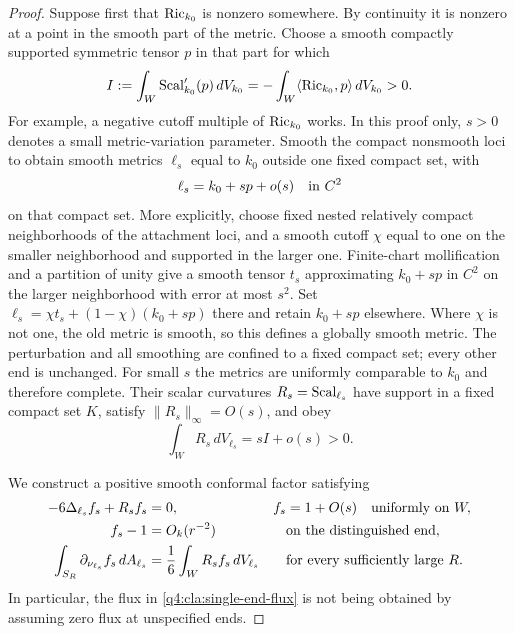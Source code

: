 \begin{proof}
Suppose first that $\operatorname{Ric}_{k_0}$ is nonzero somewhere.
By continuity it is nonzero at a point in the smooth part of the
metric.  Choose a smooth compactly supported symmetric tensor $p$
in that part for which
\begin{equation}\label{q4:cla:positive-scalar-variation}
 I:=\int_W \operatorname{Scal}'_{k_0}(p)\,dV_{k_0}
   =-\int_W\langle\operatorname{Ric}_{k_0},p\rangle\,dV_{k_0}>0.
\end{equation}
For example, a negative cutoff multiple of $\operatorname{Ric}_{k_0}$ works.
In this proof only, $s>0$ denotes a small metric-variation parameter.
Smooth the compact nonsmooth loci to obtain smooth metrics $\ell_s$
equal to $k_0$ outside one fixed compact set, with
\[
 \ell_s=k_0+s p+o(s)\quad\hbox{in }C^2
\]
on that compact set.  More explicitly, choose fixed nested relatively
compact neighborhoods of the attachment loci, and a smooth cutoff
$\chi$ equal to one on the smaller neighborhood and supported in the
larger one.  Finite-chart mollification and a partition of unity give
a smooth tensor $t_s$ approximating $k_0+s p$ in $C^2$ on the larger
neighborhood with error at most $s^2$.  Set
$\ell_s=\chi t_s+(1-\chi)(k_0+s p)$ there and retain $k_0+s p$
elsewhere.  Where $\chi$ is not one, the old metric is smooth, so this
defines a globally smooth metric.  The perturbation and all smoothing
are confined to a fixed compact set; every other end is unchanged.
For small $s$ the metrics are uniformly comparable to $k_0$ and
therefore complete.  Their scalar curvatures
$R_s=\operatorname{Scal}_{\ell_s}$ have support in a fixed compact set $K$,
satisfy $\|R_s\|_\infty=O(s)$, and obey
\begin{equation}\label{q4:cla:scalar-integral}
 \int_W R_s\,dV_{\ell_s}=sI+o(s)>0.
\end{equation}

We construct a positive smooth conformal factor satisfying
\begin{align}
 -6\Delta_{\ell_s}f_s+R_sf_s&=0,
       & f_s&=1+O(s)\quad\hbox{uniformly on }W,
       \label{q4:cla:conformal-equation}\\
 f_s-1&=O_k(r^{-2})
       &&\hbox{on the distinguished end},
       \label{q4:cla:factor-decay}\\
 \int_{S_R}\partial_{\nu_{\ell_s}}f_s\,dA_{\ell_s}
       &=\frac16\int_W R_sf_s\,dV_{\ell_s}
       &&\hbox{for every sufficiently large }R.
       \label{q4:cla:single-end-flux}
\end{align}
In particular, the flux in \eqref{q4:cla:single-end-flux} is not being
obtained by assuming zero flux at unspecified ends.


\end{proof}
